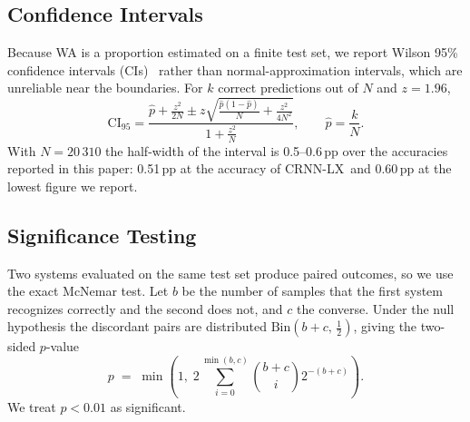 \documentclass{ws-ijprai}
\newcommand{\ours}{CRNN-LX}            %
\newcommand{\nsamples}{20\,310}
\begin{document}
\subsection{Confidence Intervals}
Because WA is a proportion estimated on a finite test set, we report
Wilson 95\% confidence intervals (CIs)~\cite{wilson1927} rather than
normal-approximation intervals, which are unreliable near the
boundaries. For $k$ correct predictions out of $N$ and $z=1.96$,
\begin{equation}
\mathrm{CI}_{95} =
\frac{\hat{p}+\frac{z^{2}}{2N} \pm
      z\sqrt{\frac{\hat{p}(1-\hat{p})}{N}+\frac{z^{2}}{4N^{2}}}}
     {1+\frac{z^{2}}{N}},
\qquad \hat{p}=\frac{k}{N}.
\label{eq:wilson}
\end{equation}
With $N=\nsamples$ the half-width of the interval is 0.5--0.6\,pp over
the accuracies reported in this paper: 0.51\,pp at the accuracy of \ours\ and
0.60\,pp at the lowest figure we report.

\subsection{Significance Testing}
Two systems evaluated on the same test set produce paired outcomes, so
we use the exact McNemar test. Let $b$ be the number of samples that
the first system recognizes correctly and the second does not, and $c$
the converse. Under the null hypothesis the discordant pairs are
distributed $\mathrm{Bin}(b+c,\,\tfrac{1}{2})$, giving the two-sided
$p$-value
\begin{equation}
p \;=\; \min\!\left(1,\;
   2\sum_{i=0}^{\min(b,c)} \binom{b+c}{i} 2^{-(b+c)}\right).
\label{eq:mcnemar}
\end{equation}
We treat $p<0.01$ as significant.
\end{document}
